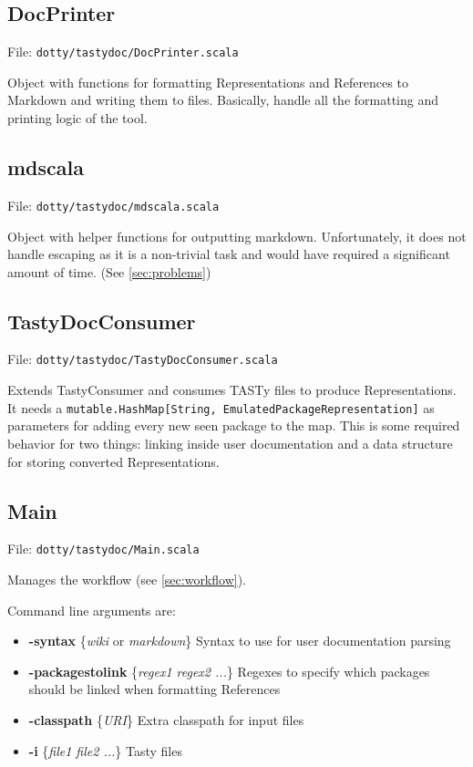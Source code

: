 \documentclass{report}
\begin{document}
\subsection{DocPrinter}
File: \texttt{dotty/tastydoc/DocPrinter.scala}

Object with functions for formatting Representations and References to Markdown and writing them to files. Basically, handle all the formatting and printing logic of the tool.

\subsection{mdscala}
File: \texttt{dotty/tastydoc/mdscala.scala}

Object with helper functions for outputting markdown. Unfortunately, it does not handle escaping as it is a non-trivial task and would have required a significant amount of time. (See \autoref{sec:problems})

\subsection{TastyDocConsumer}
File: \texttt{dotty/tastydoc/TastyDocConsumer.scala}

Extends TastyConsumer and consumes TASTy files to produce Representations. It needs a \texttt{mutable.HashMap[String, EmulatedPackageRepresentation]} as parameters for adding every new seen package to the map. This is some required behavior for two things: linking inside user documentation and a data structure for storing converted Representations.
\subsection{Main}
File: \texttt{dotty/tastydoc/Main.scala}

Manages the workflow (see \autoref{sec:workflow}).

Command line arguments are:
\begin{itemize}
    \item \textbf{-syntax} \{\textit{wiki} or \textit{markdown}\} Syntax to use for user documentation parsing
    \item \textbf{-packagestolink} \{\textit{regex1 regex2 ...}\} Regexes to specify which packages should be linked when formatting References
    \item \textbf{-classpath} \{\textit{URI}\} Extra classpath for input files
    \item \textbf{-i} \{\textit{file1 file2 ...}\} Tasty files
\end{itemize}
\end{document}
